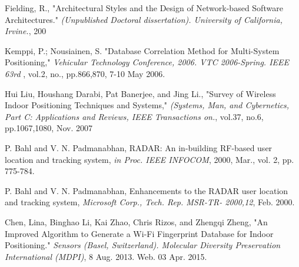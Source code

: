 \documentclass[conference]{IEEEtran}
\begin{document}
\begin{thebibliography}{99}
 Fielding, R.,
"Architectural Styles and the Design of Network-based Software Architectures."
\emph{ (Unpublished Doctoral dissertation). University of California, Irvine.}, 200

 Kemppi, P.; Nousiainen, S.
"Database Correlation Method for Multi-System Positioning,"
\emph{Vehicular Technology Conference, 2006. VTC 2006-Spring. IEEE 63rd },  vol.2, no., pp.866,870, 7-10 May 2006.

 Hui Liu, Houshang Darabi, Pat Banerjee, and Jing Li.,
"Survey of Wireless Indoor Positioning Techniques and Systems,"
\emph{ (Systems, Man, and Cybernetics, Part C: Applications and Reviews, IEEE Transactions on.}, vol.37, no.6, pp.1067,1080, Nov. 2007 

 P. Bahl and V. N. Padmanabhan,
RADAR: An in-building RF-based user location and tracking system,
\emph{in Proc. IEEE INFOCOM}, 2000, Mar., vol. 2, pp. 775-784.

 P. Bahl and V. N. Padmanabhan,
Enhancements to the RADAR user location and tracking system,
\emph{Microsoft Corp., Tech. Rep. MSR-TR- 2000,12}, Feb. 2000.

 Chen, Lina, Binghao Li, Kai Zhao, Chris Rizos, and Zhengqi Zheng,
"An Improved Algorithm to Generate a Wi-Fi Fingerprint Database for Indoor Positioning."
\emph{Sensors (Basel, Switzerland). Molecular Diversity Preservation International (MDPI)}, 8 Aug. 2013. Web. 03 Apr. 2015.


\end{thebibliography}



\end{document}
